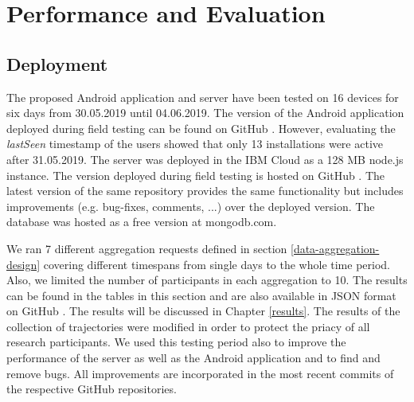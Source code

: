 \chapter{Performance and Evaluation}\label{chapter:performance}
\section{Deployment}
The proposed Android application and server have been tested on 16 devices for six days from 30.05.2019 until 04.06.2019. The version of the Android application deployed during field testing can be found on GitHub \parencite{final-version-app}. However, evaluating the \textit{lastSeen} timestamp of the users showed that only 13 installations were active after 31.05.2019. The server was deployed in the IBM Cloud as a 128 MB node.js instance. The version deployed during field testing is hosted on GitHub \parencite{final-version-server}. The latest version of the same repository provides the same functionality but includes improvements (e.g. bug-fixes, comments, ...) over the deployed version. The database was hosted as a free version at mongodb.com.

We ran 7 different aggregation requests defined in section \ref{data-aggregation-design} covering different timespans from single days to the whole time period. Also, we limited the number of participants in each aggregation to 10. The results can be found in the tables in this section and are also available in JSON format on GitHub \parencite{github-results}. The results will be discussed in Chapter \ref{results}. The results of the collection of trajectories were modified in order to protect the priacy of all research participants. We used this testing period also to improve the performance of the server as well as the Android application and to find and remove bugs. All improvements are incorporated in the most recent commits of the respective GitHub repositories.

